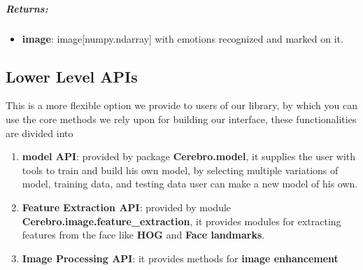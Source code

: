 \subparagraph{Returns:}
\begin{changemargin}{0.5cm}{0cm}
\begin{itemize}[noitemsep,nolistsep]
	\item \textbf{image}: image[numpy.ndarray] with emotions recognized and marked on it.
\end{itemize}
\end{changemargin}

\begin{comment}
\subparagraph{Usage:}
\begin{changemargin}{0.5cm}{0cm}
\begin{itemize}
	\item import the module:
	\begin{lstlisting}[language=Python]
	from interface Import process_image as pi\end{lstlisting}
	
	\item call it:
	\begin{lstlisting}[language=Python]
	pi.mark_faces_emotions(image)\end{lstlisting}
\end{itemize}
\end{changemargin}
\end{comment}

\subsection{Lower Level APIs}
This is a more flexible option we provide to users of our library, by which you can use the core methods we rely upon for building our interface, these functionalities are divided into
\begin{enumerate}
	\item \textbf{model API}: provided by package \textbf{Cerebro.model}, it supplies the user with tools to train and build his own model, by selecting multiple variations of model, training data, and testing data user can make a new model of his own. 
	\item \textbf{Feature Extraction API}: provided by module \textbf{Cerebro.image.feature\_extraction}, it provides modules for extracting features from the face like \textbf{HOG} and \textbf{Face landmarks}.
	\item \textbf{Image Processing API}: it provides methods for \textbf{image enhancement}
\end{enumerate}

